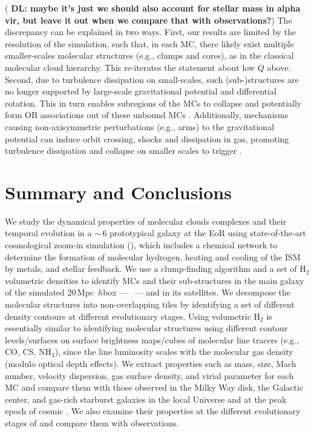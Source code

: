 \IfFileExists{emulateapjlegacy.cls}{\documentclass[iop]{emulateapjlegacy}}{\documentclass[iop]{emulateapj}}
\newcommand{\DL}[1]{({\bf \color{dlcolor} DL: #1})}
\begin{document}
\DL{maybe it's just we should also account for stellar mass in alpha vir, but leave it out when we compare that with observations?}
The discrepancy can be explained in two ways. First, our results are limited by the resolution of the simulation, such that, in each MC, there likely exist multiple smaller-scales molecular structures (e.g., clumps and cores),
as in the classical molecular cloud hierarchy. This re-iterates the statement about low $Q$ above.
%
Second, due to turbulence dissipation on small-scales, such (sub-)structures are no longer supported by large-scale gravitational potential and differential rotation. This in turn enables subregions of the MCs to collapse and potentially form OB associations out of these unbound MCs \citep{Clark04a, Clark05a}.
%
Additionally, mechanisms causing non-axisymmetric perturbations (e.g., arms) to the gravitational potential can induce orbit crossing, shocks and dissipation in gas, promoting turbulence dissipation and collapse on smaller scales to trigger \SF.


\section{Summary and Conclusions}      \label{sec:conclusion}

We study the dynamical properties of molecular clouds complexes and their temporal evolution in a \z$\sim$\,6 prototypical galaxy
at the EoR using state-of-the-art cosmological zoom-in simulation (),
which includes a chemical network to determine the formation of molecular
hydrogen, heating and cooling of the ISM by metals, and stellar feedback.
We use a clump-finding algorithm and a set of H$_2$ volumetric densities
to identify MCs and their sub-structures in the main galaxy of the
simulated 20\,Mpc~$h$\pmOne box --- \flower\ --- and in its satellites.
We decompose the molecular structures into non-overlapping tiles
by identifying a set of different density contours at different evolutionary stages.
Using volumetric H$_2$ is essentially similar to identifying molecular structures using
different contour levels/surfaces on surface brightness maps/cubes of molecular line tracers (e.g., CO, CS, NH$_3$),
since the line luminosity scales with the molecular gas density (modulo optical depth effects).
We extract properties such as mass, size, Mach number, velocity dispersion, gas surface density, and virial parameter for each MC and
compare them with those observed in the Milky Way disk, the Galactic center,
and gas-rich starburst galaxies in the local Universe and at the peak epoch of cosmic \SF.
We also examine their properties at the different evolutionary stages of \flower and compare
them with observations.
\end{document}

